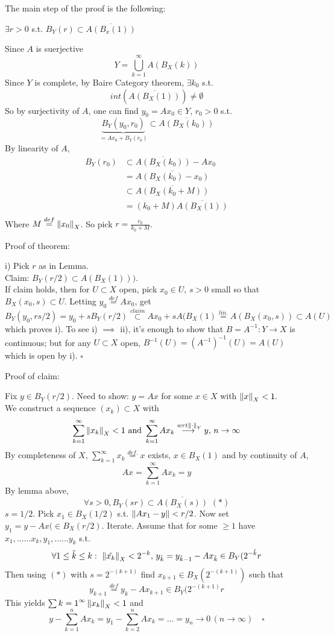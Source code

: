 \documentclass{article}
\begin{document}
The main step of the proof is the following:
\begin{lemma}[$A$ as in i)]\nl
$\exists r>0$ s.t. $B_Y(r)\subset \overline{A(B_x(1))}$
\begin{pf}{}{}\rm
Since $A$ is suerjective 
$$
Y=\bigcup_{k=1}^\infty A(B_X(k))
$$
Since $Y$ is complete, by  Baire Category theorem, $\exists k_0$ s.t. 
$$ int(\overline{A(B_X(1))})\neq\emptyset$$
So by surjectivity of $A$, one can find $y_0=Ax_0\in Y$, $r_0>0$ s.t. 
$$ \underbrace{B_Y(y_0,r_0)}_{=Ax_0+B_Y(r_0)}\subset \overline{A(B_X(k_0))}$$
By linearity of $A$,
\begin{equation}\nonumber
    \begin{split}
        B_Y(r_0)&\subset\overline{A(B_X(k_0))}-Ax_0 \\ &=\overline{A(B_X(k_0)-x_0)}\\
        &\subset \overline{A(B_X(k_0+M))}   \\
        &=(k_0+M)\overline{A(B_X(1))}\\
    \end{split}
\end{equation}
Where $M\stackrel{def}{=}\left\|{x_0}\right\|_X$. So pick $r=\frac{r_0}{k_0+M}$.
\end{pf}

\end{lemma}
Proof of theorem:
\begin{pf}{}{}
i) Pick $r$ as in Lemma.\\
Claim: $B_Y(r/2)\subset A(B_X(1)))$.\\
If claim holds, then for $U\subset X$ open, pick $x_0\in U$, $s>0$ small so that $B_X(x_0,s)\subset U$. Letting $y_0\stackrel{def}{=}Ax_0$, get 
$$
B_Y(y_0,rs/2)=y_0+sB_Y(r/2)\stackrel{claim}{\subset}Ax_0+sA(B_X(1)\stackrel{lin.}{=}A(B_X(x_0,s))\subset A(U)
$$
which proves i). To see i) $\implies$ ii), it's enough to show that $B=A^{-1}:Y\to X$ is continuous; but for any $U\subset X$ open, $B^{-1}(U)=(A^{-1})^{-1}(U)=A(U)$
which is open by i). $\square$
\end{pf}
Proof of claim:
\begin{pf}{}{}
Fix $y\in B_Y(r/2)$. Need to show: $y=Ax$ for some $x\in X$ with $\left\|{x}\right\|_X<1.$\\
We construct a sequence $(x_k)\subset X$ with 
$$
\sum_{k=1}^\infty \left\|{x_k}\right\|_X<1\,\,\text{and}\,\,\sum_{k=1}^\infty Ax_k\stackrel{wrt\left\|{\cdot}\right\|_Y}{\longrightarrow{}}y,\,n\to\infty
$$
By completeness of $X$, $\sum_{k=1}^\infty x_k\stackrel{def.}{=}x$ exists, $x\in B_X(1)$ and by continuity of $A$,
$$Ax=\sum_{k=1}^\infty Ax_k=y$$
By lemma above, 
$$\forall s>0, B_Y(sr)\subset \overline{A(B_X(s))}\,\,(*)$$
$s=1/2$. Pick $x_1\in B_X(1/2)$ s.t. $\left\|{Ax_1-y}\right\|<r/2$. Now set $y_1=y-Ax(\in B_X(r/2)$. Iterate. Assume that for some $\geq 1$ have $x_1,......x_k,y_1,......y_k$ s.t.
$$
\forall 1\leq\tilde{k}\leq k:\,\,\left\|{\tilde{x_k}}\right\|_X<2^{-k},\,y_{\tilde{k}}=y_{\tilde{k}-1}-Ax_{\tilde{k}}\in B_Y(2^{-\tilde{k}}r
$$
Then using $(*)$ with $s=2^{-(k+1)}$ find $x_{k+1}\in B_X(2^{-(k+1)})$ such that
$$
y_{k+1}\stackrel{def}{=}y_k-Ax_{k+1}\in B_Y(2^{-(k+1)}r
$$
This yields $\sum{k=1}^{\infty}\left\|{x_k}\right\|_X<1$ and 
$$
y-\sum_{k=1}^n Ax_k=y_1-\sum_{k=2}^n Ax_k=...=y_n\to0\,(n\to \infty)\quad\square
$$
\end{pf}
\end{document}
